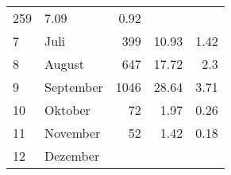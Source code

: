 \begin{longtable}{lXrrr}
       \num{259} &
       \num[round-mode=places,round-precision=2]{7,09} &
         \num[round-mode=places,round-precision=2]{0,92} \\

     7 &
     \multicolumn{1}{X}{ Juli   } &


       \num{399} &
       \num[round-mode=places,round-precision=2]{10,93} &
         \num[round-mode=places,round-precision=2]{1,42} \\

     8 &
     \multicolumn{1}{X}{ August   } &


       \num{647} &
       \num[round-mode=places,round-precision=2]{17,72} &
         \num[round-mode=places,round-precision=2]{2,3} \\

     9 &
     \multicolumn{1}{X}{ September   } &


       \num{1046} &
       \num[round-mode=places,round-precision=2]{28,64} &
         \num[round-mode=places,round-precision=2]{3,71} \\

     10 &
     \multicolumn{1}{X}{ Oktober   } &


       \num{72} &
       \num[round-mode=places,round-precision=2]{1,97} &
         \num[round-mode=places,round-precision=2]{0,26} \\

     11 &
     \multicolumn{1}{X}{ November   } &


       \num{52} &
       \num[round-mode=places,round-precision=2]{1,42} &
         \num[round-mode=places,round-precision=2]{0,18} \\

     12 &
     \multicolumn{1}{X}{ Dezember   } &



\end{longtable}
